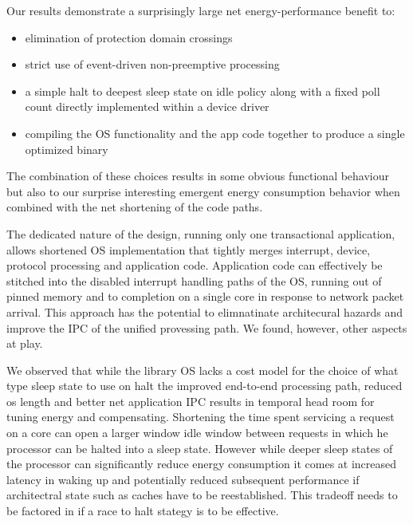 Our results demonstrate a surprisingly large net energy-performance benefit to:
\begin{itemize}
\item elimination of protection domain crossings
\item strict use of event-driven non-preemptive processing 
\item a simple halt to deepest sleep state on idle policy along with a fixed poll count directly implemented within a device driver
\item compiling the OS functionality and the app code together to produce a single optimized binary
\end{itemize}
The combination of these choices results in some obvious functional behaviour but also to our surprise  interesting emergent energy consumption behavior when combined with the net shortening of the code paths.  

The dedicated nature of the design, running only one transactional application, allows shortened OS implementation that tightly merges interrupt, device, protocol processing and application code.  
Application code can effectively be stitched into the disabled interrupt handling paths of the OS, running out of pinned memory and to completion on a single core in response to network packet arrival.    
This approach has the potential to elimnatinate architecural hazards and improve the IPC of the unified provessing path.   
We found, however, other aspects at play.   



We observed that while the library OS lacks a cost model for the choice of what type sleep state to use on halt the improved end-to-end processing path, reduced os length and better net application IPC results in temporal head room for tuning energy and compensating.   
Shortening the time spent servicing a request on a core can open a larger window idle window between requests in which he processor can be halted into a sleep state.  
However while deeper sleep states of the processor can significantly reduce energy consumption it comes at increased latency in waking up and potentially reduced subsequent performance if architectral state such as caches have to be reestablished.  
This tradeoff needs to be factored in if a race to halt stategy is to be effective.  

